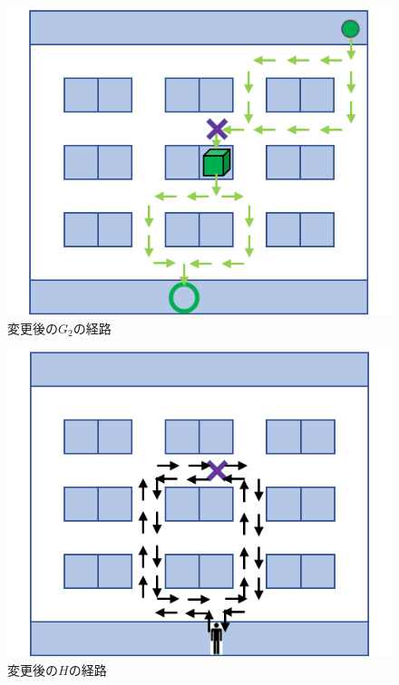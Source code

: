 \begin{figure}[h]
    \centering
    \includegraphics[scale=0.35]{figures/run_time_G2.png}
    \caption{変更後の$G_2$の経路}
    \label{fig:run_time_G2}
\end{figure}

\begin{figure}[h]
    \centering
    \includegraphics[scale=0.35]{figures/run_time_H.png}
    \caption{変更後の$H$の経路}
    \label{fig:run_time_H}
\end{figure}